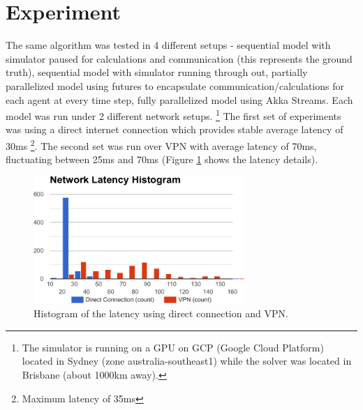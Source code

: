 \documentclass{article}
\begin{document}



\section{Experiment}
The same algorithm was tested in 4 different setups - sequential model with simulator paused for calculations and communication (this represents the ground truth), sequential model with simulator running through out, partially parallelized model using futures to encapsulate communication/calculations for each agent at every time step, fully parallelized model using Akka Streams. Each model was run under 2 different network setups. \footnote{The simulator is running on a GPU on GCP (Google Cloud Platform) located in Sydney (zone australia-southeast1) while the solver was located in Brisbane (about 1000km away).} The first set of experiments was using a direct internet connection which provides stable average latency of 30ms \footnote{Maximum latency of 35ms}. The second set was run over VPN with average latency of 70ms, fluctuating between 25ms and 70ms (Figure \ref{fig:network-latency} shows the latency details).

\begin{figure}
	\centering
	\includegraphics[width=8.0cm]{network-latency}
	\caption{Histogram of the latency using direct connection and VPN.}\label{fig:network-latency}
\end{figure}
\end{document}
